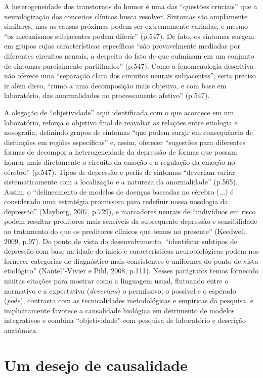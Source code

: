 A heterogeneidade dos transtornos do humor é uma das ``questões
cruciais'' que a neurologização dos conceitos clínicos busca resolver.
Sintomas são amplamente similares, mas as causas próximas podem ser
extremamente variadas, e mesmo ``os mecanismos subjacentes podem
diferir'' (p.547). De fato, os sintomas surgem em grupos cujas
características específicas ``são provavelmente mediadas por diferentes
circuitos neurais, a despeito do fato de que culminam em um conjunto de
sintomas parcialmente partilhados'' (p.547). Como a fenomenologia
descritiva não oferece uma ``separação clara dos circuitos neurais
subjacentes'', seria preciso ir além disso, ``rumo a uma decomposição
mais objetiva, e com base em laboratório, das anormalidades no
processamento afetivo'' (p.547).

A alegação de ``objetividade'' aqui identificada com o que acontece em
um laboratório, reforça o objetivo final de reavaliar as relações entre
etiologia e nosografia, definindo grupos de sintomas ``que podem surgir
em consequência de disfunções em regiões específicas'' e, assim,
oferecer ``sugestões para diferentes formas de decompor a
heterogeneidade da depressão de formas que possam honrar mais
diretamente o circuito da emoção e a regulação da emoção no cérebro''
(p.547). Tipos de depressão e perfis de sintomas ``deveriam variar
sistematicamente com a localização e a natureza da anormalidade''
(p.565). Assim, o ``delineamento de modelos de doenças baseadas no
cérebro (...) é considerado uma estratégia promissora para redefinir
nossa nosologia da depressão'' (Mayberg, 2007, p.729), e marcadores
neurais de ``indivíduos em risco podem resultar preditores mais
sensíveis da subsequente depressão e sensibilidade ao tratamento do que
os preditores clínicos que temos no presente'' (Keedwell, 2009, p.97).
Do ponto de vista do desenvolvimento, ``identificar subtipos de
depressão com base na idade do inicio e características neurobiológicas
podem nos fornecer categorias de diagnóstico mais consistentes e
uniformes do ponto de vista etiológico'' (Nantel"-Vivier e Pihl, 2008,
p.111). Nesses parágrafos temos fornecido muitas citações para mostrar
como a linguagem usual, flutuando entre o normativo e a expectativa
(\emph{deveriam}) o permissivo, o possível e o esperado (\emph{pode}),
contrasta com as tecnicalidades metodológicas e empíricas da pesquisa, e
implicitamente favorece a causalidade biológica em detrimento de modelos
integrativos e combina ``objetividade'' com pesquisa de laboratório e
descrição anatômica.

\chapter{Um desejo de causalidade}

